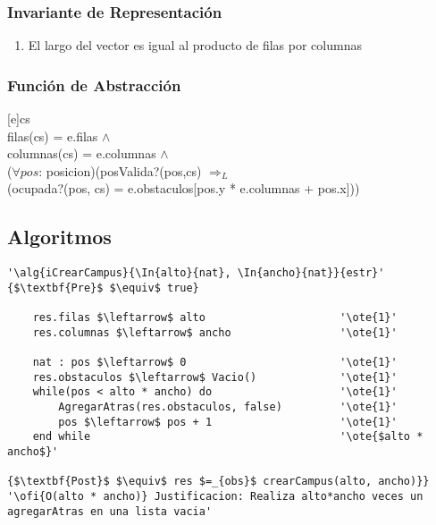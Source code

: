 \subsubsection{Invariante de Representación}

\renewcommand{\labelenumi}{(\Roman{enumi})}

\begin{enumerate}
	\item{El largo del vector es igual al producto de filas por columnas}
\end{enumerate}

\mbox{}

\subsubsection{Funci\'on de Abstracci\'on}

[e]{cs}{
	\\
	filas(cs) = e.filas $\land$ \\
	columnas(cs) = e.columnas $\land$ \\
	($\forall pos$: posicion)(posValida?(pos,cs) $\Rightarrow_L$ 
	\\ \- \- \- \- (ocupada?(pos, cs) = e.obstaculos[pos.y * e.columnas + pos.x]))
}

\subsection{Algoritmos}

\lstset{style=alg}

\begin{lstlisting}[mathescape]
'\alg{iCrearCampus}{\In{alto}{nat}, \In{ancho}{nat}}{estr}'
{$\textbf{Pre}$ $\equiv$ true}

    res.filas $\leftarrow$ alto 					'\ote{1}'
    res.columnas $\leftarrow$ ancho 				'\ote{1}'

    nat : pos $\leftarrow$ 0 						'\ote{1}'
    res.obstaculos $\leftarrow$ Vacio() 			'\ote{1}'
    while(pos < alto * ancho) do 					'\ote{1}'
    	AgregarAtras(res.obstaculos, false)			'\ote{1}'
    	pos $\leftarrow$ pos + 1					'\ote{1}'
    end while										'\ote{$alto * ancho$}'

{$\textbf{Post}$ $\equiv$ res $=_{obs}$ crearCampus(alto, ancho)}}    
'\ofi{O(alto * ancho)} Justificacion: Realiza alto*ancho veces un agregarAtras en una lista vacia'
\end{lstlisting}

